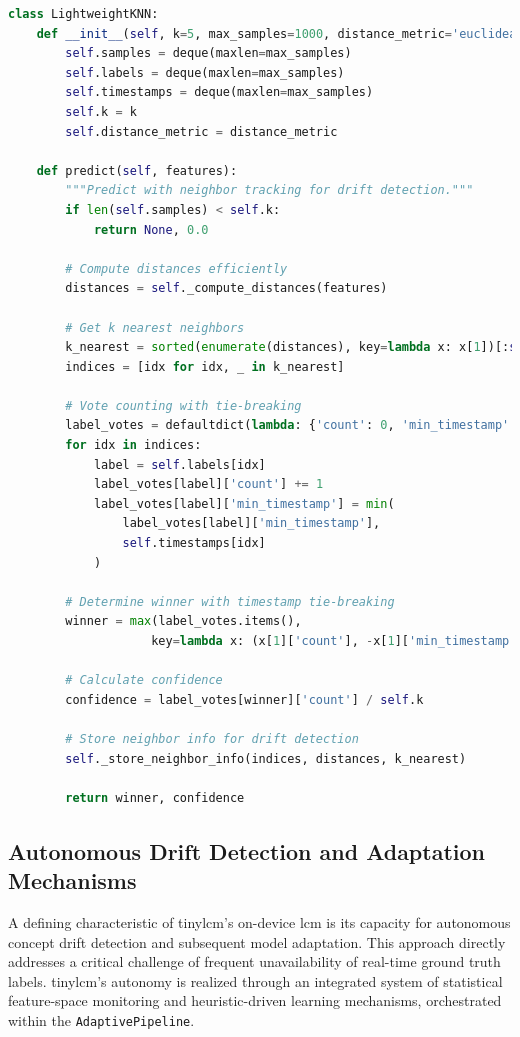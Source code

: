 \begin{lstlisting}[captionpos=b, language=Python, commentstyle=\color{blue}\itshape, caption={Example logic of the LightweightKNN Class}, label=lst:lightweightknn_predict]
class LightweightKNN:    
    def __init__(self, k=5, max_samples=1000, distance_metric='euclidean'):
        self.samples = deque(maxlen=max_samples)
        self.labels = deque(maxlen=max_samples)
        self.timestamps = deque(maxlen=max_samples)
        self.k = k
        self.distance_metric = distance_metric
        
    def predict(self, features):
        """Predict with neighbor tracking for drift detection."""
        if len(self.samples) < self.k:
            return None, 0.0
            
        # Compute distances efficiently
        distances = self._compute_distances(features)
        
        # Get k nearest neighbors
        k_nearest = sorted(enumerate(distances), key=lambda x: x[1])[:self.k]
        indices = [idx for idx, _ in k_nearest]
        
        # Vote counting with tie-breaking
        label_votes = defaultdict(lambda: {'count': 0, 'min_timestamp': float('inf')})
        for idx in indices:
            label = self.labels[idx]
            label_votes[label]['count'] += 1
            label_votes[label]['min_timestamp'] = min(
                label_votes[label]['min_timestamp'], 
                self.timestamps[idx]
            )
        
        # Determine winner with timestamp tie-breaking
        winner = max(label_votes.items(), 
                    key=lambda x: (x[1]['count'], -x[1]['min_timestamp']))[0]
        
        # Calculate confidence
        confidence = label_votes[winner]['count'] / self.k
        
        # Store neighbor info for drift detection
        self._store_neighbor_info(indices, distances, k_nearest)
        
        return winner, confidence
\end{lstlisting}

\subsection{Autonomous Drift Detection and Adaptation Mechanisms}
\label{ssec:tinylcm_drift_adaptation}

A defining characteristic of \gls{tinylcm}'s on-device \gls{lcm} is its capacity for autonomous concept drift detection and subsequent model adaptation. This approach directly addresses a critical challenge of frequent unavailability of real-time ground truth labels. \gls{tinylcm}'s autonomy is realized through an integrated system of statistical feature-space monitoring and heuristic-driven learning mechanisms, orchestrated within the \texttt{AdaptivePipeline}.

